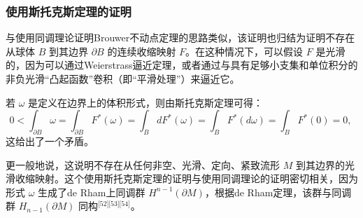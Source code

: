 \subsubsection{使用斯托克斯定理的证明}
与使用同调理论证明Brouwer不动点定理的思路类似，该证明也归结为证明不存在从球体 $B$ 到其边界 $\partial B$ 的连续收缩映射 $F$。在这种情况下，可以假设 $F$ 是光滑的，因为可以通过Weierstrass逼近定理，或者通过与具有足够小支集和单位积分的非负光滑“凸起函数”卷积（即“平滑处理”）来逼近它。

若 $\omega$ 是定义在边界上的体积形式，则由斯托克斯定理可得：
$$
0 < \int_{\partial B} \omega = \int_{\partial B} F^{*}(\omega) = \int_{B} dF^{*}(\omega) = \int_{B} F^{*}(d\omega) = \int_{B} F^{*}(0) = 0,~
$$
这给出了一个矛盾。

更一般地说，这说明不存在从任何非空、光滑、定向、紧致流形 $M$ 到其边界的光滑收缩映射。这个使用斯托克斯定理的证明与使用同调理论的证明密切相关，因为形式 $\omega$ 生成了de Rham上同调群 $H^{n-1}(\partial M)$，根据de Rham定理，该群与同调群 $H_{n-1}(\partial M)$ 同构\(^\text{[52][53][54]}\)。
